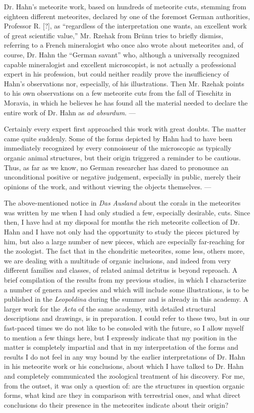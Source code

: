 \documentclass[a4paper, 12pt, oneside]{article}
\begin{document}
Dr. Hahn's meteorite work, based on hundreds of meteorite cuts, stemming from eighteen different meteorites, declared by one of the foremost German authorities, Professor R. [?], as ``regardless of the interpretation one wants, an excellent work of great scientific value,'' Mr. Rzehak from Brünn tries to briefly dismiss, referring to a French mineralogist who once also wrote about meteorites and, of course, Dr. Hahn the ``German savant'' who, although a universally recognized capable mineralogist and excellent microscopist, is not actually a professional expert in his profession, but could neither readily prove the insufficiency of Hahn's observations nor, especially, of his illustrations. Then Mr. Rzehak points to his own observations on a few meteorite cuts from the fall of Tieschitz in Moravia, in which he believes he has found all the material needed to declare the entire work of Dr. Hahn as \emph{ad absurdum}. ---

Certainly every expert first approached this work with great doubts. The matter came quite suddenly. Some of the forms depicted by Hahn had to have been immediately recognized by every connoisseur of the microscopic as typically organic animal structures, but their origin triggered a reminder to be cautious. Thus, as far as we know, no German researcher has dared to pronounce an unconditional positive or negative judgement, especially in public, merely their opinions of the work, and without viewing the objects themselves. ---

The above-mentioned notice in \emph{Das Ausland} about the corals in the meteorites was written by me when I had only studied a few, especially desirable, cuts. Since then, I have had at my disposal for months the rich meteorite collection of Dr. Hahn and I have not only had the opportunity to study the pieces pictured by him, but also a large number of new pieces, which are especially far-reaching for the zoologist. The fact that in the chondritic meteorites, some less, others more, we are dealing with a multitude of organic inclusions, and indeed from very different families and classes, of related animal detritus is beyond reproach. A brief compilation of the results from my previous studies, in which I characterize a number of genera and species and which will include some illustrations, is to be published in the \emph{Leopoldina} during the summer and is already in this academy. A larger work for the \emph{Acta} of the same academy, with detailed structural descriptions and drawings, is in preparation. I could refer to these two, but in our fast-paced times we do not like to be consoled with the future, so I allow myself to mention a few things here, but I expressly indicate that my position in the matter is completely impartial and that in my interpretation of the forms and results I do not feel in any way bound by the earlier interpretations of Dr. Hahn in his meteorite work or his conclusions, about which I have talked to Dr. Hahn and completely communicated the zoological treatment of his discovery. For me, from the outset, it was only a question of: are the structures in question organic forms, what kind are they in comparison with terrestrial ones, and what direct conclusions do their presence in the meteorites indicate about their origin?
\end{document}
